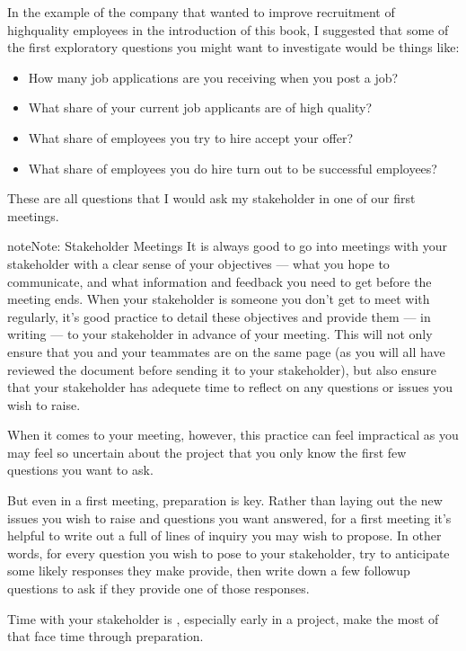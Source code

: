 \documentclass[letterpaper,10pt,english]{jupyterBook}
\begin{document}
\sphinxAtStartPar
In the example of the company that wanted to improve recruitment of high\sphinxhyphen{}quality employees in the introduction of this book, I suggested that some of the first exploratory questions you might want to investigate would be things like:
\begin{itemize}
\item {} 
\sphinxAtStartPar
How many job applications are you receiving when you post a job?

\item {} 
\sphinxAtStartPar
What share of your current job applicants are of high quality?

\item {} 
\sphinxAtStartPar
What share of employees you try to hire accept your offer?

\item {} 
\sphinxAtStartPar
What share of employees you do hire turn out to be successful employees?

\end{itemize}

\sphinxAtStartPar
These are all questions that I would ask my stakeholder in one of our first meetings.

\begin{sphinxadmonition}{note}{Note:}
\sphinxAtStartPar
Stakeholder Meetings
It is always good to go into meetings with your stakeholder with a clear sense of your objectives — what you hope to communicate, and what information and feedback you need to get before the meeting ends. When your stakeholder is someone you don’t get to meet with regularly, it’s good practice to detail these objectives and provide them — in writing — to your stakeholder in advance of your meeting. This will not only ensure that you and your teammates are on the same page (as you will all have reviewed the document before sending it to your stakeholder), but also ensure that your stakeholder has adequete time to reflect on any questions or issues you wish to raise.

\sphinxAtStartPar
When it comes to your  meeting, however, this practice can feel impractical as you may feel so uncertain about the project that you only know the first few questions you want to ask.

\sphinxAtStartPar
But even in a first meeting, preparation is key. Rather than laying out the new issues you wish to raise and questions you want answered, for a first meeting it’s helpful to write out a full  of lines of inquiry you may wish to propose. In other words, for every question you wish to pose to your stakeholder, try to anticipate some likely responses they make provide, then write down a few followup questions to ask if they provide one of those responses.

\sphinxAtStartPar
Time with your stakeholder is , especially early in a project, make the most of that face time through preparation.
\end{sphinxadmonition}
\end{document}
